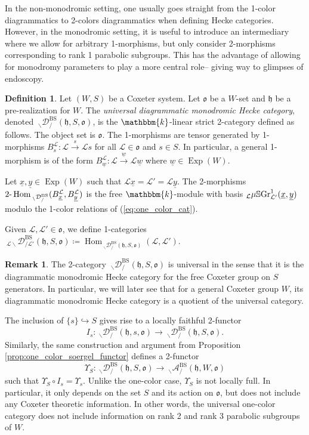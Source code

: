 \documentclass{amsart}
\renewcommand{\k}{\mathbbm{k}}
\newcommand{\scrL}{\mathcal{L}}
\DeclareMathOperator{\Hom}{Hom}
\newcommand{\TwoHom}{2\textnormal{-}\Hom}
\newcommand{\fr}[1]{\mathfrak{#1}}
\DeclareMathOperator{\BS}{BS}
\newcommand{\EWmon}[2]{\:_{#1 \backslash} \mathcal{D}_{/ #2} }
\newcommand{\Amon}[2]{\:_{#1 \backslash} \mathcal{A}_{/ #2} }
\DeclareMathOperator{\Exp}{Exp}
\newcommand{\VSGraph}{\mu\mathbb{S}\textnormal{Gr}}
\newcommand{\uw}{\underline{w}}
\newcommand{\ux}{\underline{x}}
\newcommand{\uy}{\underline{y}}
\theoremstyle{definition}
\newtheorem{definition}[subsubsection]{Definition}
\newtheorem{remark}[subsubsection]{Remark}
\numberwithin{equation}{subsection}
\begin{document}
In the non-monodromic setting, one usually goes straight from the 1-color diagrammatics to 2-colors diagrammatics when defining Hecke categories.
However, in the monodromic setting, it is useful to introduce an intermediary where we allow for arbitrary 1-morphisms, but only consider 2-morphisms corresponding to rank 1 parabolic subgroups.
This has the advantage of allowing for monodromy parameters to play a more central role-- giving way to glimpses of endoscopy.

\begin{definition}\label{defn:univ_one_color_cat}
    Let $(W,S)$ be a Coxeter system. Let $\fr{o}$ be a $W$-set and $\fr{h}$ be a pre-realization for $W$.
    The \emph{universal diagrammatic monodromic Hecke category}, denoted $\EWmon{}{}^{\BS} (\fr{h}, S, \fr{o})$, is the $\k$-linear strict 2-category defined as follows.
    The object set is $\fr{o}$. The 1-morphisms are tensor generated by 1-morphisms $B_s^{\scrL} : \scrL \stackrel{s}{\to} \scrL s$ for all $\scrL \in \fr{o}$ and $s \in S$.
    In particular, a general 1-morphism is of the form $B_{\uw}^{\scrL} : \scrL \stackrel{\uw}{\to} \scrL \uw$ where $\uw \in \Exp (W)$.

    Let $\ux, \uy \in \Exp (W)$ such that $\scrL \ux = \scrL' = \scrL \uy$.
    The 2-morphisms $\TwoHom_{\EWmon{}{}^{\BS}} (B_{\ux}^{\scrL}, B_{\uy}^{\scrL})$ is the free $\k$-module with basis ${}_{\scrL} \VSGraph_{\scrL'}^1 (\ux, \uy)$ modulo the 1-color relations of (\ref{eq:one_color_cat}).

    Given $\scrL, \scrL' \in \fr{o}$, we define 1-categories $\EWmon{\scrL}{\scrL'}^{\BS} (\fr{h}, S, \fr{o}) \coloneq \Hom_{\EWmon{}{}^{\BS} (\fr{h}, S, \fr{o})} (\scrL, \scrL')$. 
\end{definition}

\begin{remark}
The 2-category $\EWmon{}{}^{\BS} (\fr{h}, S, \fr{o})$ is universal in the sense that it is the diagrammatic monodromic Hecke category for the free Coxeter group on $S$ generators.
In particular, we will later see that for a general Coxeter group $W$, its diagrammatic monodromic Hecke category is a quotient of the universal category.
\end{remark}

The inclusion of $\{s\} \hookrightarrow S$ gives rise to a locally faithful 2-functor
\[I_{s} : \EWmon{}{}^{\BS} (\fr{h}, s, \fr{o}) \to \EWmon{}{}^{\BS} (\fr{h}, S, \fr{o}).\]
Similarly, the same construction and argument from Proposition \ref{prop:one_color_soergel_functor} defines a 2-functor
\[\Upsilon_S : \EWmon{}{}^{\BS} (\fr{h}, S, \fr{o}) \to \Amon{}{}^{\BS} (\fr{h}, W, \fr{o})\]
such that $\Upsilon_S \circ I_{s} = \Upsilon_s$. Unlike the one-color case, $\Upsilon_S$ is not locally full. 
In particular, it only depends on the set $S$ and its action on $\fr{o}$, but does not include any Coxeter theoretic information.
In other words, the universal one-color category does not include information on rank 2 and rank 3 parabolic subgroups of $W$.
\end{document}
